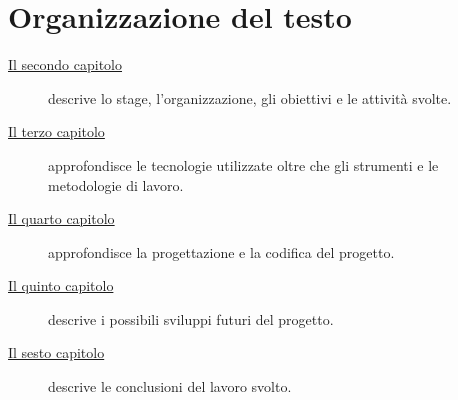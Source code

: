 \section{Organizzazione del testo}

\begin{description}
    \item[{\hyperref[cap:descrizione-stage]{Il secondo capitolo}}] descrive lo stage, l'organizzazione, gli obiettivi e le attività svolte.
    
    \item[{\hyperref[cap:tecnologie]{Il terzo capitolo}}] approfondisce le tecnologie utilizzate oltre che gli strumenti e le metodologie di lavoro.
    
    \item[{\hyperref[cap:progettazione-codifica]{Il quarto capitolo}}] approfondisce la progettazione e la codifica del progetto.
    
    \item[{\hyperref[cap:sviluppi-futuri]{Il quinto capitolo}}] descrive i possibili sviluppi futuri del progetto.
    
    \item[{\hyperref[cap:conclusioni]{Il sesto capitolo}}] descrive le conclusioni del lavoro svolto.
\end{description}